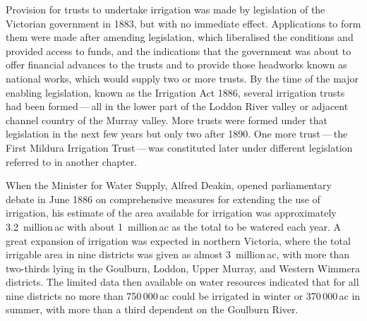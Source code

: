 Provision for trusts to undertake irrigation was made by legislation
of the Victorian government in 1883, but with no immediate effect.
Applications to form them were made after amending legislation, which
liberalised the conditions and provided access to funds, and the
indications that the government was about to offer financial advances
to the trusts and to provide those headworks known as national works,
which would supply two or more trusts.  By the time of the major
enabling legislation, known as the Irrigation Act 1886, several
irrigation trusts had been formed\,---\,all in the lower part of the
Loddon River valley or adjacent channel country of the Murray valley.
More trusts were formed under that legislation in the next few years
but only two after 1890.  One more trust\,---\,the First Mildura
Irrigation Trust\,---\,was constituted later under different legislation
referred to in another chapter.

When the Minister for Water Supply, Alfred Deakin, opened
parliamentary debate in June 1886 on comprehensive measures for
extending the use of irrigation, his estimate of the area available
for irrigation was approximately 3.2~million\,ac with about
1~million\,ac as the total to be watered each year.  A great expansion
of irrigation was expected in northern Victoria, where the total
irrigable area in nine districts was given as almost 3~million\,ac,
with more than two-thirds lying in the Goulburn, Loddon, Upper Murray,
and Western Wimmera districts.  The limited data then available on
water resources indicated that for all nine districts no more than
750\,000\,ac could be irrigated in winter or 370\,000\,ac in summer,
with more than a third dependent on the Goulburn River.

